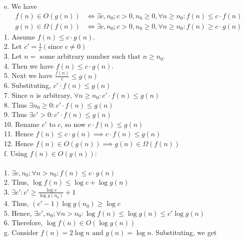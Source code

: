 \documentclass[12pt]{report}
\newcommand{\no}{\noindent}
\newcommand{\tab}{\hspace*{.6cm}}
\begin{document}
	\no e. We have 
	\begin{align*}
	f(n) \in O(g(n)) &\iff \exists c, n_0;c > 0, n_0 \geq 0, \forall n \geq n_0: f(n) \leq c \cdot f(n)\\
	g(n) \in \Omega(f(n)) &\iff \exists c, n_0;c > 0, n_0 \geq 0, \forall n \geq n_0: f(n) \geq c \cdot g(n)
	\end{align*}
	\tab 1. Assume $f(n) \leq c \cdot g(n)$.\\
	\tab 2. Let $c' = \frac{1}{c} \left(\text{since } c \neq 0\right)$\\
	\tab 3. Let $n = \text{ some arbitrary number such that } n \geq n_0$.\\
	\tab 4. Then we have $f(n) \leq c \cdot g(n)$.\\
	\tab 5. Next we have $\frac{f(n)}{c} \leq g(n)$\\
	\tab 6. Substituting, $c' \cdot f(n) \leq g(n)$\\
	\tab 7. Since $n$ is arbitrary, $\forall n \geq n_0: c' \cdot f(n) \leq g(n)$\\
	\tab 8. Thus $\exists n_0 \geq 0 : c' \cdot f(n) \leq g(n)$\\
	\tab 9. Thus $\exists c' >0 : c' \cdot f(n) \leq g(n)$\\
	\tab 10. Rename $c'$ to $c$, so now $c \cdot f(n) \leq g(n)$\\
	\tab 11. Hence $f(n) \leq c \cdot g(n) \implies c \cdot f(n) \leq g(n)$\\
	\tab 12. Hence $f(n) \in O(g(n)) \implies g(n) \in \Omega(f(n))$\\
	
	\no f. Using $f(n) \in O(g(n))$:\\
	\\
	\tab 1. $\exists c, n_0; \forall n > n_0 : f(n) \leq c \cdot g(n)$\\
	\tab 2. Thus, $\log{f(n)} \leq \log{c} + \log{g(n)}$\\
	\tab 3. $\exists c' : c' \geq \frac{\log{c}}{\log{g(n_0)}} + 1$\\
	\tab 4. Thus, $(c' - 1)\log{g(n_0)} \geq \log{c}$\\
	\tab 5. Hence, $\exists c', n_0; \forall n > n_0:\log{f(n)} \leq \log{g(n)} \leq c'\log{g(n)}$\\
	\tab 6. Therefore, $\log{f(n)} \in O(\log{g(n)})$\\
	
	\no g. Consider $f(n) = 2\log{n} \text{ and } g(n) = \log{n}$. Substituting, we get \\
	
\end{document}
